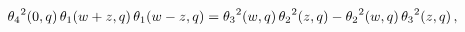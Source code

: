 \[{\mathop{\theta_{4}\/}\nolimits^{2}}\!\left(0,q\right)\mathop{\theta_{1}\/}%
\nolimits\!\left(w+z,q\right)\mathop{\theta_{1}\/}\nolimits\!\left(w-z,q\right%
)={\mathop{\theta_{3}\/}\nolimits^{2}}\!\left(w,q\right){\mathop{\theta_{2}\/}%
\nolimits^{2}}\!\left(z,q\right)-{\mathop{\theta_{2}\/}\nolimits^{2}}\!\left(w%
,q\right){\mathop{\theta_{3}\/}\nolimits^{2}}\!\left(z,q\right),\]